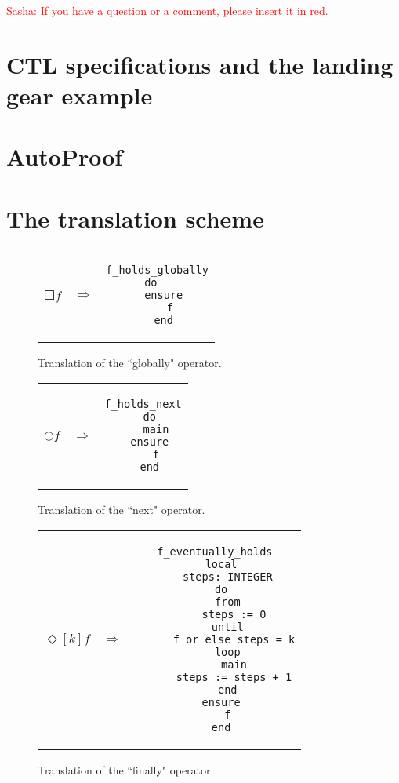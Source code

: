 \textcolor{red}{Sasha: If you have a question or a comment, please insert it in red.}

\section{CTL specifications and the landing gear example}
\label{sec:landing_gear_example}

\cite{arcaini2014modeling}

\section{AutoProof}
\label{sec:autoproof}

\cite{tschannen2015autoproof}

\section{The translation scheme}
\label{sec:translation_scheme}


\begin{figure}
\begin{tabular}{c c c}
$\Square f$
&
$\Longrightarrow$
&
\begin{lstlisting}
f_holds_globally
  do    
  ensure
    f
  end
\end{lstlisting}
\end{tabular}
\caption{Translation of the ``globally" operator.}
\label{fig:ltl_globally_eiffel}
\end{figure}


\begin{figure}
\begin{tabular}{c c c}
$\Circle f$ 
&
$\Longrightarrow$
&
\begin{lstlisting}
f_holds_next
  do
    main
  ensure
    f
  end
\end{lstlisting}
\end{tabular}
\caption{Translation of the ``next" operator.}
\label{fig:ltl_next_eiffel}
\end{figure}


\begin{figure}
\begin{tabular}{c c c}
$\Diamond[k] f$
&
$\Longrightarrow$
&
\begin{lstlisting}
f_eventually_holds
  local
    steps: INTEGER
  do
    from
      steps := 0
    until
      f or else steps = k
    loop
      main
      steps := steps + 1
    end
  ensure
    f
  end
\end{lstlisting}
\end{tabular}
\caption{Translation of the ``finally" operator.}
\label{fig:ltl_eventually_eiffel}
\end{figure}


